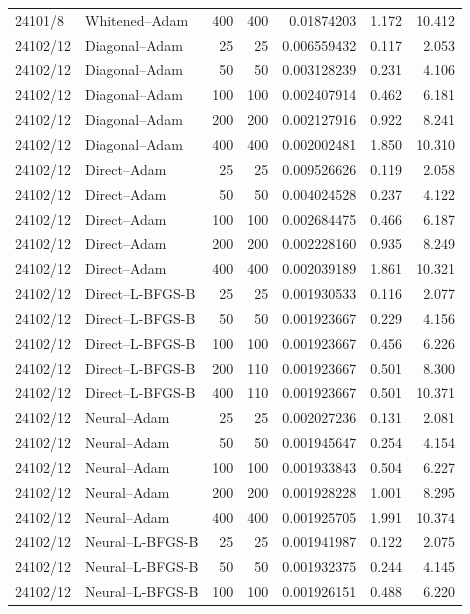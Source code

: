\begin{longtable}{llrrrrr}
24101/8 & Whitened--Adam & 400 & 400 & 0.01874203 & 1.172 & 10.412\\
24102/12 & Diagonal--Adam & 25 & 25 & 0.006559432 & 0.117 & 2.053\\
24102/12 & Diagonal--Adam & 50 & 50 & 0.003128239 & 0.231 & 4.106\\
24102/12 & Diagonal--Adam & 100 & 100 & 0.002407914 & 0.462 & 6.181\\
24102/12 & Diagonal--Adam & 200 & 200 & 0.002127916 & 0.922 & 8.241\\
24102/12 & Diagonal--Adam & 400 & 400 & 0.002002481 & 1.850 & 10.310\\
24102/12 & Direct--Adam & 25 & 25 & 0.009526626 & 0.119 & 2.058\\
24102/12 & Direct--Adam & 50 & 50 & 0.004024528 & 0.237 & 4.122\\
24102/12 & Direct--Adam & 100 & 100 & 0.002684475 & 0.466 & 6.187\\
24102/12 & Direct--Adam & 200 & 200 & 0.002228160 & 0.935 & 8.249\\
24102/12 & Direct--Adam & 400 & 400 & 0.002039189 & 1.861 & 10.321\\
24102/12 & Direct--L-BFGS-B & 25 & 25 & 0.001930533 & 0.116 & 2.077\\
24102/12 & Direct--L-BFGS-B & 50 & 50 & 0.001923667 & 0.229 & 4.156\\
24102/12 & Direct--L-BFGS-B & 100 & 100 & 0.001923667 & 0.456 & 6.226\\
24102/12 & Direct--L-BFGS-B & 200 & 110 & 0.001923667 & 0.501 & 8.300\\
24102/12 & Direct--L-BFGS-B & 400 & 110 & 0.001923667 & 0.501 & 10.371\\
24102/12 & Neural--Adam & 25 & 25 & 0.002027236 & 0.131 & 2.081\\
24102/12 & Neural--Adam & 50 & 50 & 0.001945647 & 0.254 & 4.154\\
24102/12 & Neural--Adam & 100 & 100 & 0.001933843 & 0.504 & 6.227\\
24102/12 & Neural--Adam & 200 & 200 & 0.001928228 & 1.001 & 8.295\\
24102/12 & Neural--Adam & 400 & 400 & 0.001925705 & 1.991 & 10.374\\
24102/12 & Neural--L-BFGS-B & 25 & 25 & 0.001941987 & 0.122 & 2.075\\
24102/12 & Neural--L-BFGS-B & 50 & 50 & 0.001932375 & 0.244 & 4.145\\
24102/12 & Neural--L-BFGS-B & 100 & 100 & 0.001926151 & 0.488 & 6.220\\

\end{longtable}
